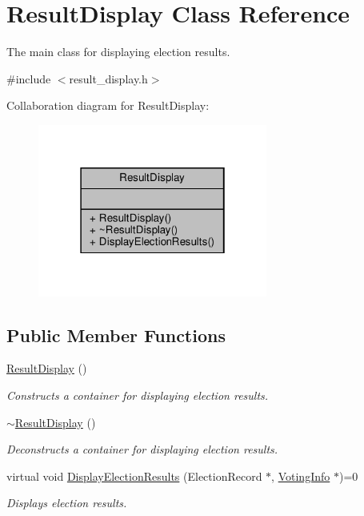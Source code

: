\hypertarget{classResultDisplay}{}\section{Result\+Display Class Reference}
\label{classResultDisplay}


The main class for displaying election results.  




{\ttfamily \#include $<$result\+\_\+display.\+h$>$}



Collaboration diagram for Result\+Display\+:\nopagebreak
\begin{figure}[H]
\begin{center}
\leavevmode
\includegraphics[width=214pt]{classResultDisplay__coll__graph}
\end{center}
\end{figure}
\subsection*{Public Member Functions}
\begin{DoxyCompactItemize}
\item 
\mbox{\label{classResultDisplay_ab2395a9e2f5723c8a737469bef03a2b5}} 
\hyperlink{classResultDisplay_ab2395a9e2f5723c8a737469bef03a2b5}{Result\+Display} ()
\begin{DoxyCompactList}\small\item\em Constructs a container for displaying election results. \end{DoxyCompactList}\item 
\mbox{\label{classResultDisplay_a763c9837857c1dd00d06aa2fc6d357fb}} 
\hyperlink{classResultDisplay_a763c9837857c1dd00d06aa2fc6d357fb}{$\sim$\+Result\+Display} ()
\begin{DoxyCompactList}\small\item\em Deconstructs a container for displaying election results. \end{DoxyCompactList}\item 
virtual void \hyperlink{classResultDisplay_aa5c34c71893f44bf148983c0ddf35627}{Display\+Election\+Results} (Election\+Record $\ast$, \hyperlink{classVotingInfo}{Voting\+Info} $\ast$)=0
\begin{DoxyCompactList}\small\item\em Displays election results. \end{DoxyCompactList}\end{DoxyCompactItemize}


